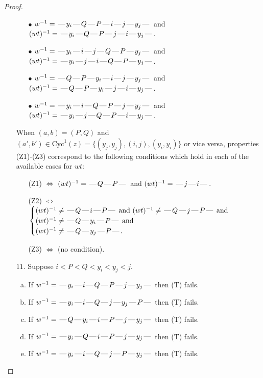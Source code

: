 \documentclass[10pt]{article}
\theoremstyle{definition}
\theoremstyle{definition}
\def\dash{\text{\hspace{0.5mm}---\hspace{0.5mm}}}
\def\Cyc{\mathrm{Cyc}}
\begin{document}
\begin{proof}
\begin{enumerate}
\begin{enumerate}
\item[$\bullet$] $w^{-1} = \dash y_i\dash Q\dash P\dash i\dash j\dash y_j\dash $ and $(wt)^{-1} = \dash y_i\dash Q\dash P\dash j\dash i\dash y_j\dash $.
\item[$\bullet$] $w^{-1} = \dash y_i\dash i\dash j\dash Q\dash P\dash y_j\dash $ and $(wt)^{-1} = \dash y_i\dash j\dash i\dash Q\dash P\dash y_j\dash $.
\item[$\bullet$] $w^{-1} = \dash Q\dash P\dash y_i\dash i\dash j\dash y_j\dash $ and $(wt)^{-1} = \dash Q\dash P\dash y_i\dash j\dash i\dash y_j\dash $.
\item[$\bullet$] $w^{-1} = \dash y_i\dash i\dash Q\dash P\dash j\dash y_j\dash $ and $(wt)^{-1} = \dash y_i\dash j\dash Q\dash P\dash i\dash y_j\dash $.
\end{enumerate}
When $(a,b)= (P,Q)$ and $(a',b')\in \Cyc^1(z)=\{(y_j,y_j),(i,j),(y_i,y_i)\}$ or vice versa,
properties (Z1)-(Z3) correspond to the following conditions which
hold in each of the available cases for $wt$:
\begin{enumerate}
\item[](Z1) $\Leftrightarrow$ $(wt)^{-1} = \dash Q \dash P \dash$  and $(wt)^{-1} = \dash j \dash i \dash$.
\item[](Z2) $\Leftrightarrow$ $\begin{cases}\text{$(wt)^{-1} \neq \dash Q \dash i \dash P \dash$ and $(wt)^{-1}\neq \dash Q \dash j \dash P \dash$}\text{ and }\\
\text{$(wt)^{-1} \neq \dash Q \dash y_i \dash P \dash$}\text{ and }\\
\text{$(wt)^{-1} \neq \dash Q \dash y_j \dash P \dash$}.\end{cases}$
\item[](Z3) $\Leftrightarrow$ (no condition).
\end{enumerate}
\item[$11$.] Suppose $i < P < Q < y_i < y_j < j$.
\begin{enumerate}[(a)]
\item If $w^{-1} = \dash y_i\dash i\dash Q\dash P\dash j\dash y_j\dash $ then (T) fails.
\item If $w^{-1} = \dash y_i\dash i\dash Q\dash j\dash y_j\dash P\dash $ then (T) fails.
\item If $w^{-1} = \dash Q\dash y_i\dash i\dash P\dash j\dash y_j\dash $ then (T) fails.
\item If $w^{-1} = \dash y_i\dash Q\dash i\dash P\dash j\dash y_j\dash $ then (T) fails.
\item If $w^{-1} = \dash y_i\dash i\dash Q\dash j\dash P\dash y_j\dash $ then (T) fails.

\end{enumerate}
\end{enumerate}
\end{proof}
\end{document}
